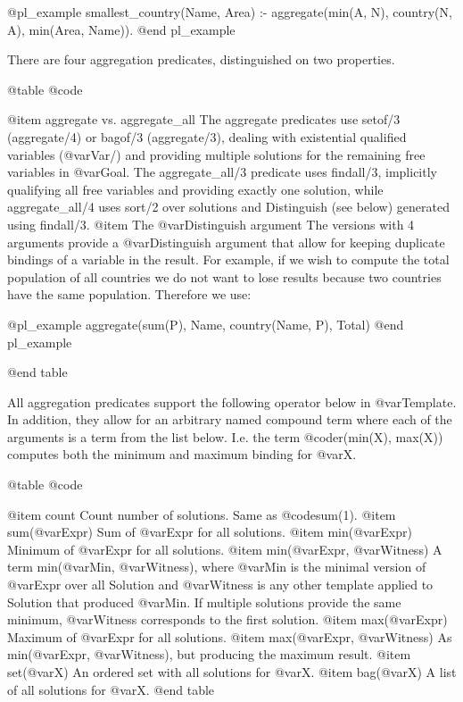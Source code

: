 @pl_example
smallest_country(Name, Area) :-
        aggregate(min(A, N), country(N, A), min(Area, Name)).
@end pl_example

There are four aggregation predicates, distinguished on two properties.

@table @code

@item aggregate vs. aggregate_all
    The aggregate predicates use setof/3 (aggregate/4) or bagof/3
    (aggregate/3), dealing with existential qualified variables
    (@var{Var}/) and providing multiple solutions for the
    remaining free variables in @var{Goal}. The aggregate_all/3
    predicate uses findall/3, implicitly qualifying all free variables
    and providing exactly one solution, while aggregate_all/4 uses
    sort/2 over solutions and Distinguish (see below) generated using
    findall/3. 
@item The @var{Distinguish} argument
    The versions with 4 arguments provide a @var{Distinguish} argument
    that allow for keeping duplicate bindings of a variable in the
    result. For example, if we wish to compute the total population of
    all countries we do not want to lose results because two countries
    have the same population. Therefore we use:

@pl_example
        aggregate(sum(P), Name, country(Name, P), Total)
@end pl_example

@end table

All aggregation predicates support the following operator below in
@var{Template}. In addition, they allow for an arbitrary named compound
term where each of the arguments is a term from the list below. I.e. the
term @code{r(min(X), max(X))} computes both the minimum and maximum
binding for @var{X}.

@table @code

@item count
    Count number of solutions. Same as @code{sum(1)}. 
@item sum(@var{Expr})
    Sum of @var{Expr} for all solutions. 
@item min(@var{Expr})
    Minimum of @var{Expr} for all solutions. 
@item min(@var{Expr}, @var{Witness})
    A term min(@var{Min}, @var{Witness}), where @var{Min} is the minimal version of @var{Expr}
    over all Solution and @var{Witness} is any other template applied to
    Solution that produced @var{Min}. If multiple solutions provide the same
    minimum, @var{Witness} corresponds to the first solution. 
@item max(@var{Expr})
    Maximum of @var{Expr} for all solutions. 
@item max(@var{Expr}, @var{Witness})
    As min(@var{Expr}, @var{Witness}), but producing the maximum result. 
@item set(@var{X})
    An ordered set with all solutions for @var{X}. 
@item bag(@var{X})
    A list of all solutions for @var{X}. 
@end table

